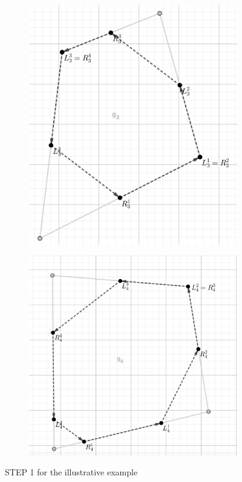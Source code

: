 \documentclass[10pt,a4paper]{elsarticle}
\begin{document}
\begin{figure}[h!]
\begin{subfigure}[b]{.35\textwidth}
	\caption{}
\end{subfigure}
\begin{subfigure}[b]{.35\textwidth}
	\includegraphics[width=\textwidth]{example_tour_g3_Step1_new_gray.png}
	\caption{}
\end{subfigure}
\begin{subfigure}[b]{.35\textwidth}
	\includegraphics[width=\textwidth]{example_tour_g4_Step1_new_gray.png}
	\caption{}
\end{subfigure}
\caption{STEP 1 for the illustrative example}%
\label{fig:example2}%
\end{figure}
\end{document}
